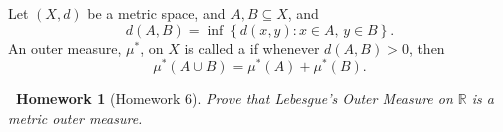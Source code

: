 \documentclass[notoc,notitlepage]{tufte-book}
\newtheorem*{homework}{\faCogs\ Homework}
\begin{document}
\begin{defn}\label{defn:metric_outer_measure}
  Let $(X, d)$ be a metric space, and $A, B \subseteq X$, and
  \begin{equation*}
    d(A, B) = \inf \left\{ d(x, y) : x \in A,\, y \in B \right\}.
  \end{equation*}
  An outer measure, $\mu^*$, on $X$ is called a 
  if whenever $d(A, B) > 0$, then
  \begin{equation*}
    \mu^*(A \cup B) = \mu^*(A) + \mu^*(B).
  \end{equation*}
\end{defn}

\begin{homework}[Homework 6]\label{homework:6}
  Prove that Lebesgue's Outer Measure on $\mathbb{R}$ is a metric outer measure.
\end{homework}
\end{document}
